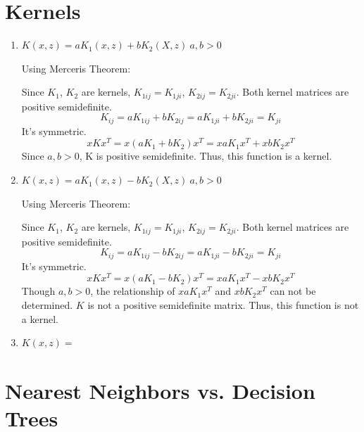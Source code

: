 \documentclass[a4paper, 12pt, titlepage]{article}
\begin{document}
\section{Kernels}
\begin{enumerate}
    \item $K(x,z) = aK_1(x,z) + bK_2(X,z)~ a,b>0$

        Using Merceris Theorem:

        Since $K_1$, $K_2$ are kernels, $K_{1ij} = K_{1ji}$, $K_{2ij} = K_{2ji}$. Both kernel matrices are positive semidefinite.
        $$K_{ij} = aK_{1ij} + bK_{2ij} = aK_{1ji} + bK_{2ji} = K_{ji}$$ It's symmetric.
        $$xKx^T = x(aK_1+bK_2)x^T=xaK_1x^T + xbK_2x^T$$
        Since $a,b>0$, K is positive semidefinite.
        Thus, this function is a kernel.
        
    \item $K(x,z) = aK_1(x,z) - bK_2(X,z)~ a,b>0$

        Using Merceris Theorem:

        Since $K_1$, $K_2$ are kernels, $K_{1ij} = K_{1ji}$, $K_{2ij} = K_{2ji}$. Both kernel matrices are positive semidefinite.
        $$K_{ij} = aK_{1ij} - bK_{2ij} = aK_{1ji} - bK_{2ji} = K_{ji}$$ It's symmetric.
        $$xKx^T = x(aK_1-bK_2)x^T=xaK_1x^T - xbK_2x^T$$
        Though $a,b>0$, the relationship of $xaK_1x^T$ and $xbK_2x^T$ can not be determined. $K$ is not a positive semidefinite matrix. Thus, this function is not a kernel.

    \item $K(x,z) = $
\end{enumerate}

\section{Nearest Neighbors vs. Decision Trees}
\end{document}
